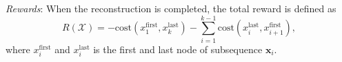 \textit{Rewards}: 
When the reconstruction is completed, the total reward is defined as
\begin{equation}
{R(\mathcal{X})=-\text{cost}(x_{1}^{\text{first}}, x_{k}^{\text{last}})-\sum\limits_{i=1}^{k-1}\text{cost}(x_{i}^{\text{last}}, x_{i+1}^{\text{first}})},
\label{eq:Reward}
\end{equation}
where $x_{i}^{\text{first}}$ and $x_{i}^{\text{last}}$ is the first and last node of subsequence $\boldsymbol{x}_i$. 

